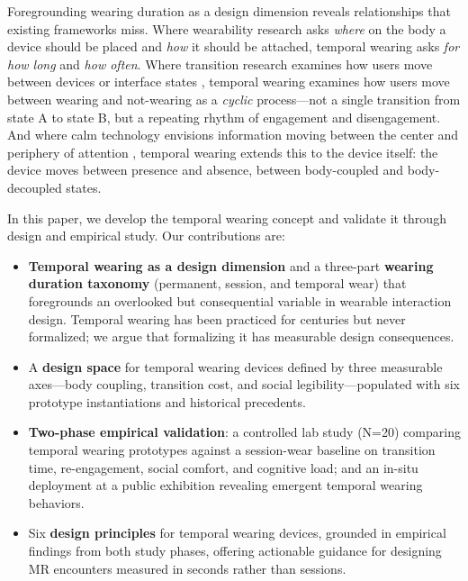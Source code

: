 Foregrounding wearing duration as a design dimension reveals relationships that existing frameworks miss. Where wearability research asks \textit{where} on the body a device should be placed \cite{gemperle1998wearability, zeagler2017where} and \textit{how} it should be attached, temporal wearing asks \textit{for how long} and \textit{how often}. Where transition research examines how users move between devices or interface states \cite{hubenschmid2025hybrid}, temporal wearing examines how users move between wearing and not-wearing as a \textit{cyclic} process---not a single transition from state A to state B, but a repeating rhythm of engagement and disengagement. And where calm technology envisions information moving between the center and periphery of attention \cite{weiser1996calm}, temporal wearing extends this to the device itself: the device moves between presence and absence, between body-coupled and body-decoupled states.

In this paper, we develop the temporal wearing concept and validate it through design and empirical study. Our contributions are:

\begin{itemize}
    \item[\textbf{C1}] \textbf{Temporal wearing as a design dimension} and a three-part \textbf{wearing duration taxonomy} (permanent, session, and temporal wear) that foregrounds an overlooked but consequential variable in wearable interaction design. Temporal wearing has been practiced for centuries but never formalized; we argue that formalizing it has measurable design consequences.
    \item[\textbf{C2}] A \textbf{design space} for temporal wearing devices defined by three measurable axes---body coupling, transition cost, and social legibility---populated with six prototype instantiations and historical precedents.
    \item[\textbf{C3}] \textbf{Two-phase empirical validation}: a controlled lab study (N=20) comparing temporal wearing prototypes against a session-wear baseline on transition time, re-engagement, social comfort, and cognitive load; and an in-situ deployment at a public exhibition revealing emergent temporal wearing behaviors.
    \item[\textbf{C4}] Six \textbf{design principles} for temporal wearing devices, grounded in empirical findings from both study phases, offering actionable guidance for designing MR encounters measured in seconds rather than sessions.
\end{itemize}
